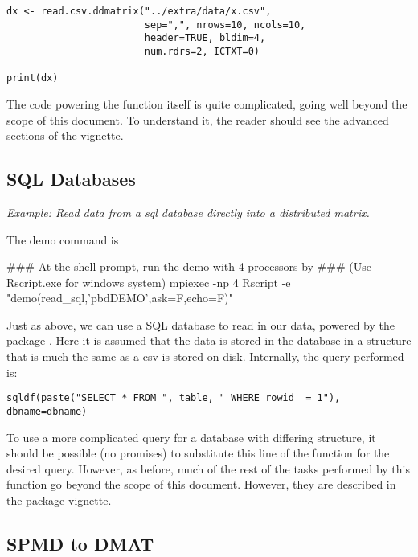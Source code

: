 \begin{lstlisting}[language=rr,title=Reading a CSV with Multiple Readers]
dx <- read.csv.ddmatrix("../extra/data/x.csv", 
                        sep=",", nrows=10, ncols=10, 
                        header=TRUE, bldim=4, 
                        num.rdrs=2, ICTXT=0)

print(dx)
\end{lstlisting}

The code powering the function itself is quite complicated, going well beyond the scope of this document.  To understand it, the reader should see the advanced sections of the  vignette.

\subsection{SQL Databases}
\label{sec:sql_db}

\emph{Example:  Read data from a sql database directly into a distributed matrix.}

The demo command is
\begin{Command}
### At the shell prompt, run the demo with 4 processors by
### (Use Rscript.exe for windows system)
mpiexec -np 4 Rscript -e "demo(read_sql,'pbdDEMO',ask=F,echo=F)"
\end{Command}

Just as above, we can use a SQL database to read in our data, powered by the  package \cite{sqldf}.  Here it is assumed that the data is stored in the database in a structure that is much the same as a csv is stored on disk.  Internally, the query performed is:

\begin{lstlisting}[language=rr]
sqldf(paste("SELECT * FROM ", table, " WHERE rowid  = 1"), dbname=dbname)
\end{lstlisting}

To use a more complicated query for a database with differing structure, it should be possible (no promises) to substitute this line of the  function for the desired query.  However, as before, much of the rest of the tasks performed by this function go beyond the scope of this document.  However, they are described in the  package vignette.

\subsection{SPMD to DMAT}
\label{sec:spmd2dmat}

